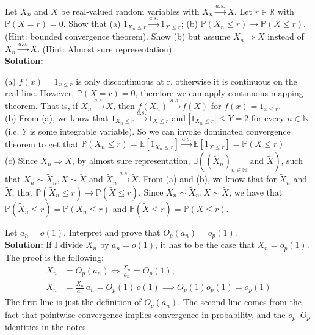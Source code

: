 \documentclass[11pt,letterpaper]{article}                  %
\begin{document}
\bigskip

\begin{problem} Let $X_n$ and $X$ be real-valued random variables with $X_n \xrightarrow{a.s.} X.$ Let $r \in \mathbb{R}$ with $\mathbb{P}(X = r) = 0$. Show that 
	(a) $1_{X_n \leq r} \xrightarrow{a.s.} 1_{X \leq r}$;
	(b) $\mathbb{P}(X_n \leq r) \rightarrow \mathbb{P}(X \leq r)$. (Hint: bounded convergence theorem).
	Show (b) but assume $X_n \Rightarrow X$ instead of $X_n \xrightarrow{a.s.} X.$ (Hint: Almost sure representation) \\
	
\textbf{Solution:}	

	(a) $f(x) = 1_{x \leq r}$ is only discontinuous at r, otherwise it is continuous on the real line. However, $\mathbb{P}(X = r) = 0$, therefore we can apply continuous mapping theorem. That is, if $X_n \xrightarrow{a.s.} X$, then $f(X_n) \xrightarrow{a.s.} f(X)$ for $f(x) = 1_{x \leq r}$. \\
	
	(b) From (a), we know that $1_{X_n \leq r} \xrightarrow{a.s.} 1_{X \leq r}$ and $|1_{X_n \leq r}| \leq Y = 2$ for every $n \in \mathbb{N}$ (i.e. $Y$ is some integrable variable). So we can invoke dominated convergence theorem to get that $\mathbb{P}(X_n \leq r) = \mathbb{E}\left[1_{X_n \leq r}\right] \xrightarrow{a.s.} \mathbb{E}\left[1_{X \leq r}\right] = \mathbb{P}(X \leq r)$. \\ 
	
	(c) Since $X_n \Rightarrow X$, by almost sure representation, $\exists \left( (\tilde{X}_n)_{n \in \mathbb{N}} \text{ and } \tilde{X} \right)$, such that $X_n \sim \tilde{X}_n, X \sim \tilde{X}$ and $\tilde{X}_n \xrightarrow{a.s.} \tilde{X}.$ From (a) and (b), we know that for $\tilde{X}_n$ and $\tilde{X}$, that $\mathbb{P}(\tilde{X}_n \leq r) \rightarrow \mathbb{P}(\tilde{X} \leq r)$. Since $X_n \sim \tilde{X}_n, X \sim \tilde{X}$, we have that $\mathbb{P}(\tilde{X}_n \leq r) = \mathbb{P}(X_n \leq r)$ and $\mathbb{P}(\tilde{X} \leq r) = \mathbb{P}(X \leq r)$.
\end{problem}

\bigskip
\begin{problem}
Let $a_n = o(1)$.
Interpret and prove that $O_p(a_n) = o_p(1)$. \\

\textbf{Solution:} If I divide $X_n$ by $a_n = o(1)$, it has to be the case that $X_n  = o_p(1)$.
The proof is the following:
\begin{align*}
  X_n &= O_p (a_n) \iff \frac{X_n}{a_n} = O_p(1); \\
  X_n &= \frac{X_n}{a_n} \, a_n = O_p(1) \, o(1) \implies O_p(1) o_p(1) = o_p(1)
\end{align*}
The first line is just the definition of $O_p(a_n)$.
The second line comes from the fact that pointwise convergence implies convergence in probability, and the $o_p$--$O_p$ identities in the notes.
\end{problem}
\end{document}
